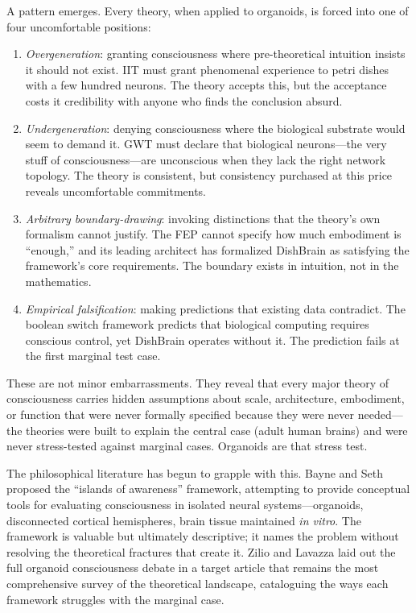 A pattern emerges. Every theory, when applied to organoids, is forced into one of four uncomfortable positions:

\begin{enumerate}[label=(\alph*)]
    \item \textit{Overgeneration}: granting consciousness where pre-theoretical intuition insists it should not exist. IIT must grant phenomenal experience to petri dishes with a few hundred neurons. The theory accepts this, but the acceptance costs it credibility with anyone who finds the conclusion absurd.

    \item \textit{Undergeneration}: denying consciousness where the biological substrate would seem to demand it. GWT must declare that biological neurons---the very stuff of consciousness---are unconscious when they lack the right network topology. The theory is consistent, but consistency purchased at this price reveals uncomfortable commitments.

    \item \textit{Arbitrary boundary-drawing}: invoking distinctions that the theory's own formalism cannot justify. The FEP cannot specify how much embodiment is ``enough,'' and its leading architect has formalized DishBrain as satisfying the framework's core requirements. The boundary exists in intuition, not in the mathematics.

    \item \textit{Empirical falsification}: making predictions that existing data contradict. The boolean switch framework predicts that biological computing requires conscious control, yet DishBrain operates without it. The prediction fails at the first marginal test case.
\end{enumerate}

These are not minor embarrassments. They reveal that every major theory of consciousness carries hidden assumptions about scale, architecture, embodiment, or function that were never formally specified because they were never needed---the theories were built to explain the central case (adult human brains) and were never stress-tested against marginal cases. Organoids are that stress test.

The philosophical literature has begun to grapple with this. Bayne and Seth \cite{bayne2020islands} proposed the ``islands of awareness'' framework, attempting to provide conceptual tools for evaluating consciousness in isolated neural systems---organoids, disconnected cortical hemispheres, brain tissue maintained \textit{in vitro}. The framework is valuable but ultimately descriptive; it names the problem without resolving the theoretical fractures that create it. Zilio and Lavazza \cite{zilio2023consciousness} laid out the full organoid consciousness debate in a target article that remains the most comprehensive survey of the theoretical landscape, cataloguing the ways each framework struggles with the marginal case.

